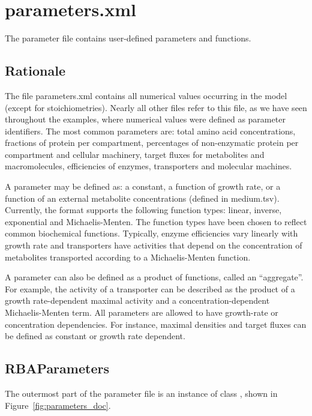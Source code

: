 
\section{parameters.xml}

The parameter file contains user-defined parameters and functions.

\subsection{Rationale}

The file parameters.xml contains all numerical values occurring in the model
(except for stoichiometries).
Nearly all other files refer to this file, as we have seen throughout the
examples, where numerical values were defined as parameter identifiers.
The most common parameters are: total amino acid concentrations,
fractions of protein per compartment,
percentages of non-enzymatic protein per compartment and cellular machinery,
target fluxes for metabolites and macromolecules, efficiencies of enzymes,
transporters and molecular machines.

A parameter may be defined as: a constant, a function of growth rate,
or a function of an external metabolite concentrations (defined in medium.tsv).
Currently, the format supports the following function types:
linear, inverse, exponential and Michaelis-Menten.
The function types have been chosen to reflect common biochemical functions.
Typically, enzyme efficiencies vary linearly with growth rate
and transporters have activities that depend on the concentration of metabolites transported
according to a Michaelis-Menten function.

A parameter can also be defined as a product of functions, called an “aggregate”.
For example, the activity of a transporter can be described
as the product of a growth rate-dependent maximal activity and a
concentration-dependent Michaelis-Menten term.
All parameters are allowed to have growth-rate or concentration dependencies.
For instance, maximal densities and target fluxes can be defined as constant or growth rate dependent.

\subsection{RBAParameters}
\label{sec:rba_parameters}

The outermost part of the parameter file is an instance of class
\rbaparameters, shown in Figure~\ref{fig:parameters_doc}.

